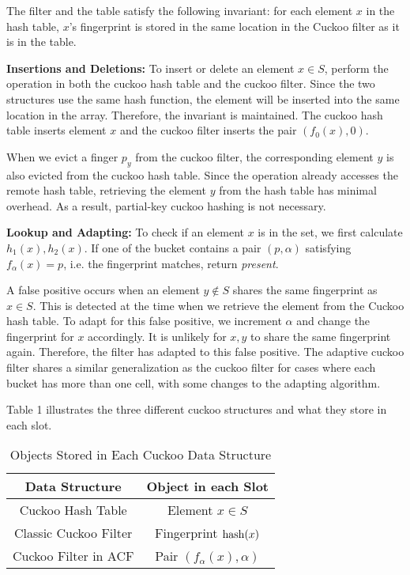 \documentclass[../paper.tex]{subfiles}
\begin{document}
The filter and the table satisfy the following invariant: for each element $x$ in the hash table, $x$'s fingerprint is stored in the same location in the Cuckoo filter as it is in the table.

\textbf{Insertions and Deletions:} To insert or delete an element $x\in S$, perform the operation in both the cuckoo hash table and the cuckoo filter.
Since the two structures use the same hash function, the element will be inserted into the same location in the array. Therefore, the invariant is maintained.
The cuckoo hash table inserts element $x$ and the cuckoo filter inserts the pair $(f_0(x),0)$.

When we evict a finger $p_y$ from the cuckoo filter, the corresponding element $y$ is also evicted from the cuckoo hash table.
Since the operation already accesses the remote hash table, retrieving the element $y$ from the hash table has minimal overhead. As a result, partial-key cuckoo hashing is not necessary.

\textbf{Lookup and Adapting:} To check if an element $x$ is in the set, we first calculate $h_1(x), h_2(x)$. If one of the bucket contains a pair $(p,\alpha)$ satisfying $f_\alpha(x)=p$, i.e. the fingerprint matches, return \textit{present}.

A false positive occurs when an element $y\not\in S$ shares the same fingerprint as $x\in S$. This is detected at the time when we retrieve the element from the
Cuckoo hash table. To adapt for this false positive, we increment $\alpha$ and change the fingerprint for $x$ accordingly. It is unlikely for $x,y$ to share the same fingerprint again.
Therefore, the filter has adapted to this false positive. The adaptive cuckoo filter shares a similar generalization as the cuckoo filter for cases where each bucket has more than one cell, with some changes to the adapting algorithm.

Table 1 illustrates the three different cuckoo structures and what they store in each slot.

\begin{table}
\centering
\label{cuckoo-tab}
\begin{tabular}{|c|c|}
\hline  Data Structure & Object in each Slot \\
\hline Cuckoo Hash Table & Element $x\in S$ \\
\hline Classic Cuckoo Filter & Fingerprint $\operatorname{hash}(x)$ \\
\hline Cuckoo Filter in ACF & Pair $(f_\alpha(x),\alpha)$ \\ \hline
\end{tabular}
\caption{Objects Stored in Each Cuckoo Data Structure}
\end{table}
\end{document}
